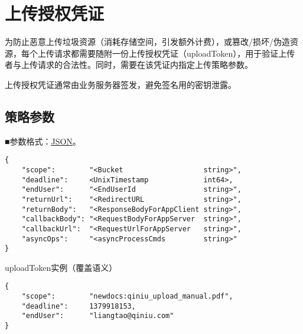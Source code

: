 \documentclass[11pt, oneside]{book}
\newcommand{\qpara}[1]{
\vspace{0.3em}
\noindent
#1\par
\vspace{0.3em}
}
\begin{document}
\chapter{上传授权凭证}

\qpara{为防止恶意上传垃圾资源（消耗存储空间，引发额外计费），或篡改/损坏/伪造资源，每个上传请求都需要随附一份上传授权凭证（uploadToken），用于验证上传者与上传请求的合法性。同时，需要在该凭证内指定上传策略参数。}
\qpara{上传授权凭证通常由业务服务器签发，避免签名用的密钥泄露。}

\section{策略参数}

\qpara{■\thinspace 参数格式：\href{http://zh.wikipedia.org/wiki/JSON}{JSON}。}
\begin{lstlisting}
{
    "scope":        "<Bucket                   string>",
    "deadline":     <UnixTimestamp             int64>,
    "endUser":      "<EndUserId                string>",
    "returnUrl":    "<RedirectURL              string>",
    "returnBody":   "<ResponseBodyForAppClient string>",
    "callbackBody": "<RequestBodyForAppServer  string>",
    "callbackUrl":  "<RequestUrlForAppServer   string>",
    "asyncOps":     "<asyncProcessCmds         string>"
}
\end{lstlisting}

\begin{sample}
  \caption{uploadToken实例（覆盖语义）}
\begin{lstlisting}
{
    "scope":        "newdocs:qiniu_upload_manual.pdf",
    "deadline":     1379918153,
    "endUser":      "liangtao@qiniu.com"
}
\end{lstlisting}

  \label{uploadToken-overwrite}
\end{sample}
\end{document}
